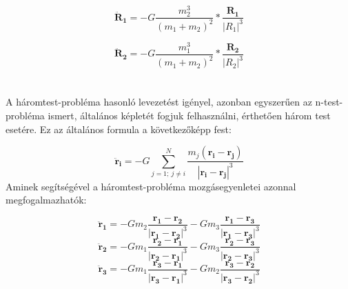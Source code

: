 \begin{multicols}{2}
\begin{equation} \label{eq:22}
    \boldsymbol{\ddot{R}_{1}}
    =
    - G \frac{m_{2}^{3}}{\left( m_{1} + m_{2} \right)^{2}} * \frac{\boldsymbol{R_{1}}}{\left| R_{1} \right|^{3}} 
\end{equation}

\begin{equation} \label{eq:23}
    \boldsymbol{\ddot{R}_{2}}
    =
    - G \frac{m_{1}^{3}}{\left( m_{1} + m_{2} \right)^{2}} * \frac{\boldsymbol{R_{2}}}{\left| R_{2} \right|^{3}}
\end{equation}
\\ \\
A háromtest-probléma hasonló levezetést igényel, azonban egyszerűen az n-test-probléma ismert, általános képletét fogjuk felhasználni, érthetően három test esetére. Ez az általános formula a következőképp fest:

\begin{equation}
    \boldsymbol{\ddot{r}_{i}}
    =
    - G \sum_{j = 1;\ j \neq i}^{N} \frac{m_{j} \left( \boldsymbol{r_{i}} - \boldsymbol{r_{j}} \right)}{\left| \boldsymbol{r_{i}} - \boldsymbol{r_{j}} \right|^{3}}
\end{equation}
Aminek segítségével a háromtest-probléma mozgásegyenletei azonnal megfogalmazhatók:

\begin{equation}
    \boldsymbol{\ddot{r}_{1}}
    =
    - G m_{2} \frac{\boldsymbol{r_{1}} - \boldsymbol{r_{2}}}{\left| \boldsymbol{r_{1}} - \boldsymbol{r_{2}} \right|^{3}}
    - G m_{3} \frac{\boldsymbol{r_{1}} - \boldsymbol{r_{3}}}{\left| \boldsymbol{r_{1}} - \boldsymbol{r_{3}} \right|^{3}}
\end{equation}
\begin{equation}
    \boldsymbol{\ddot{r}_{2}}
    =
    - G m_{1} \frac{\boldsymbol{r_{2}} - \boldsymbol{r_{1}}}{\left| \boldsymbol{r_{2}} - \boldsymbol{r_{1}} \right|^{3}}
    - G m_{3} \frac{\boldsymbol{r_{2}} - \boldsymbol{r_{3}}}{\left| \boldsymbol{r_{2}} - \boldsymbol{r_{3}} \right|^{3}}
\end{equation}
\begin{equation}
    \boldsymbol{\ddot{r}_{3}}
    =
    - G m_{1} \frac{\boldsymbol{r_{3}} - \boldsymbol{r_{1}}}{\left| \boldsymbol{r_{3}} - \boldsymbol{r_{1}} \right|^{3}}
    - G m_{2} \frac{\boldsymbol{r_{3}} - \boldsymbol{r_{2}}}{\left| \boldsymbol{r_{3}} - \boldsymbol{r_{2}} \right|^{3}}
\end{equation}


\end{multicols}

